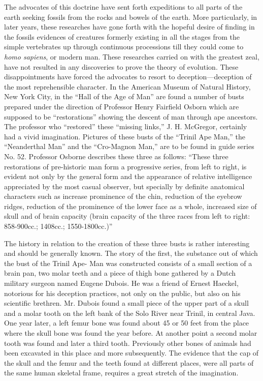 The advocates of this doctrine have sent forth expeditions to all parts of the earth seeking
fossils from the rocks and bowels of the earth. More particularly, in later years, these
researches have gone forth with the hopeful desire of finding in the fossils evidences of
creatures formerly existing in all the stages from the simple vertebrates up through
continuous processions till they could come to \textit{homo sapiens}, or modern man. These
researches carried on with the greatest zeal, have not resulted in any discoveries to prove the
theory of evolution. These disappointments have forced the advocates to resort to
deception—deception of the most reprehensible character. In the American Museum of
Natural History, New York City, in the ``Hall of the Age of Man'' are found a number of
busts prepared under the direction of Professor Henry Fairfield Osborn which are supposed
to be ``restorations'' showing the descent of man through ape ancestors. The professor who
``restored'' these ``missing links,'' J. H. McGregor, certainly had a vivid imagination. Pictures
of these busts of the ``Trinil Ape Man,'' the ``Neanderthal Man'' and the ``Cro-Magnon Man,''
are to be found in guide series No. 52. Professor Osborne describes these three as follows:
``These three restorations of pre-historic man form a progressive series, from left to right, is
evident not only by the general form and the appearance of relative intelligence appreciated
by the most casual observer, but specially by definite anatomical characters such as increase
prominence of the chin, reduction of the eyebrow ridges, reduction of the prominence of the
lower face as a whole, increased size of skull and of brain capacity (brain capacity of the
three races from left to right: 858-900cc.; 1408cc.; 1550-1800cc.)''

The history in relation to the creation of these three busts is rather interesting and should be
generally known. The story of the first, the substance out of which the bust of the Trinil Ape-
Man was constructed consists of a small section of a brain pan, two molar teeth and a piece
of thigh bone gathered by a Dutch military surgeon named Eugene Dubois. He was a friend
of Ernest Haeckel, notorious for his deception practices, not only on the public, but also on
his scientific brethren. Mr. Dubois found a small piece of the upper part of a skull and a
molar tooth on the left bank of the Solo River near Trinil, in central Java. One year later, a
left femur bone was found about 45 or 50 feet from the place where the skull bone was found
the year before. At another point a second molar tooth was found and later a third tooth.
Previously other bones of animals had been excavated in this place and more subsequently.
The evidence that the cap of the skull and the femur and the teeth found at different places,
were all parts of the same human skeletal frame, requires a great stretch of the imagination.

